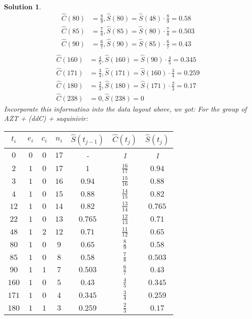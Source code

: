 \documentclass[11pt]{article}
\newtheorem{sol}{Solution}
\begin{document}
\begin{sol}
\begin{align*}
		\hat{C}(80) &= \frac{8}{9}, \hat{S}(80) = \hat{S}(48)\cdot \frac{8}{9} =0.58\\
		\hat{C}(85) &= \frac{7}{8}, \hat{S}(85) = \hat{S}(80)\cdot \frac{7}{8} =0.503\\
		\hat{C}(90) &= \frac{6}{7}, \hat{S}(90) = \hat{S}(85)\cdot \frac{6}{7} = 0.43\\
		\end{align*}
	\begin{align*}
		\hat{C}(160) &= \frac{4}{5}, \hat{S}(160) = \hat{S}(90)\cdot \frac{4}{5} = 0.345\\
		\hat{C}(171) &= \frac{3}{4}, \hat{S}(171) = \hat{S}(160)\cdot \frac{3}{4} = 0.259\\
		\hat{C}(180) &= \frac{2}{3}, \hat{S}(180) = \hat{S}(171)\cdot \frac{2}{3} = 0. 17\\
		\hat{C}(238) &= 0, \hat{S}(238) = 0
	\end{align*}
	Incorporate this informatino into the data layout above, we got:
	For the group of AZT + (ddC) + saquinivir:
	\begin{center}
	\begin{tabular}{ccccccc}
		\hline
		$t_i$& $e_i$ & $c_i$ & $n_i$ &$\hat{S}(t_{j - 1})$&$\hat{C}(t_j)$& $\hat{S}(t_j)$\\
		\hline
		$0$ & $0$ & $0$ & $17$ &-& 1 & 1\\
		$2$ & $1$ & $0$ & $17$ & $1$& $\frac{16}{17}$ & $0.94$\\
		$3$ & $1$ & $0$ & $16$ & $0.94$ & $\frac{15}{16}$ & $0.88$\\
		$4$ & $1$ & $0$ & $15$ & $0.88$ & $\frac{14}{15}$ & $0.82$\\
		$12$ & $1$ & $0$ & $14$ & $0.82$ & $\frac{13}{14}$ & $0.765$\\
		$22$ & $1$ & $0$ & $13$ & $0.765$ & $\frac{12}{13}$ & $0.71$\\
		$48$ & $1$ & $2$ & $12$ & $0.71$ &  $\frac{11}{12}$ & $0.65$\\
		$80$& $1$ & $0$ & $9$ & $0.65$ & $\frac{8}{9}$ & $0.58$\\
		$85$& $1$ & $0$ & $8$  & $0.58$ & $\frac{7}{8}$ & $0.503$\\
		$90$& $1$ & $1$ & $7$ & $0.503$ & $\frac{6}{7}$ & $0.43$\\
		$160$& $1$ & $0$ & $5$ & $0.43$ & $\frac{4}{5}$ & $0.345$\\
		$171$& $1$ & $0$& $4$ & $0.345$ & $\frac{3}{4}$ & $0.259$\\
		$180$& $1$& $1$& $3$ & $0.259$ & $\frac{2}{3}$ & $0.17$\\

\end{tabular}
\end{center}
\end{sol}
\end{document}
